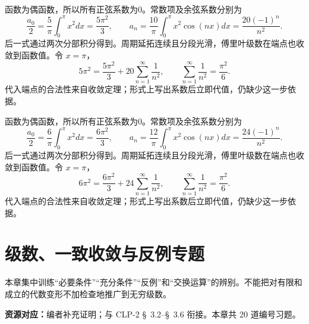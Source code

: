 \documentclass[12pt,fontset=fandol]{ctexart}
\begin{document}
\begin{solve}\label{ans:c28q23}
函数为偶函数，所以所有正弦系数为0。常数项及余弦系数分别为
\[
\frac{a_0}2=\frac{5}\pi\int_0^\pi x^2dx=\frac{5\pi^2}3,\qquad a_n=\frac{10}\pi\int_0^\pi x^2\cos(nx)dx=\frac{20(-1)^n}{n^2}.
\]
后一式通过两次分部积分得到。周期延拓连续且分段光滑，傅里叶级数在端点也收敛到函数值。令 $x=\pi$，
\[
5\pi^2=\frac{5\pi^2}3+20\sum_{n=1}^\infty\frac1{n^2},\qquad\sum_{n=1}^\infty\frac1{n^2}=\frac{\pi^2}6.
\]
代入端点的合法性来自收敛定理；形式上写出系数后立即代值，仍缺少这一步依据。
\end{solve}

\begin{solve}\label{ans:c28q24}
函数为偶函数，所以所有正弦系数为0。常数项及余弦系数分别为
\[
\frac{a_0}2=\frac{6}\pi\int_0^\pi x^2dx=\frac{6\pi^2}3,\qquad a_n=\frac{12}\pi\int_0^\pi x^2\cos(nx)dx=\frac{24(-1)^n}{n^2}.
\]
后一式通过两次分部积分得到。周期延拓连续且分段光滑，傅里叶级数在端点也收敛到函数值。令 $x=\pi$，
\[
6\pi^2=\frac{6\pi^2}3+24\sum_{n=1}^\infty\frac1{n^2},\qquad\sum_{n=1}^\infty\frac1{n^2}=\frac{\pi^2}6.
\]
代入端点的合法性来自收敛定理；形式上写出系数后立即代值，仍缺少这一步依据。
\end{solve}

\clearpage
\section{级数、一致收敛与反例专题}\label{sec:ch29}
本章集中训练“必要条件”“充分条件”“反例”和“交换运算”的辨别。不能把对有限和成立的代数变形不加检查地推广到无穷级数。

\textbf{资源对应：}编者补充证明；与 CLP-2 \S~3.2--\S~3.6 衔接。本章共 20 道编号习题。
\end{document}
